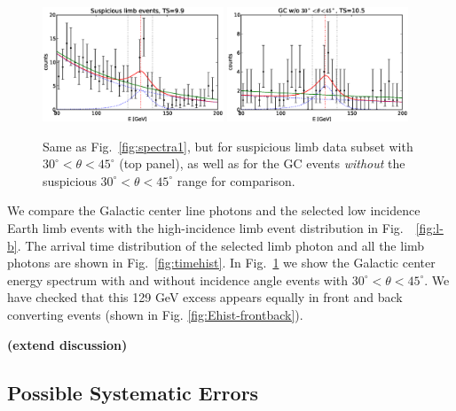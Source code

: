 \documentclass[aps,twocolumn,prd,superscriptaddress,showpacs,nofootinbib,fixfloat]{revtex4}
\newcommand{\degree}{^{\rm o}}
\begin{document}
\begin{figure}
  \centering
  \includegraphics[width=0.48\textwidth]{plots/counts_suspiciousLimb.eps}
  \includegraphics[width=0.48\textwidth]{plots/counts_GC_wo3045.eps}
  \caption{Same as Fig.~\ref{fig:spectra1}, but for
  suspicious limb data subset with
  $30^\circ<\theta<45^\circ$ (top panel), as well as for the
  GC events \emph{without} the suspicious
  $30^\circ<\theta<45^\circ$ range for comparison.}
  \label{fig:spectra2}
\end{figure}


We compare the Galactic center line photons and the selected
low incidence Earth limb events with the high-incidence limb
event distribution in Fig.~~\ref{fig:l-b}. The arrival time
distribution of the selected limb photon and all the limb
photons are shown in Fig.~\ref{fig:timehist}. In
Fig.~\ref{fig:spectra2} we show the Galactic center energy
spectrum with and without incidence angle events with
$30^\circ<\theta<45^\circ$.  We have checked that this 129
GeV excess appears equally in front and back converting
events (shown in Fig.  \ref{fig:Ehist-frontback}).

\textbf{(extend discussion)}

\subsection{Possible Systematic Errors}
\end{document}
